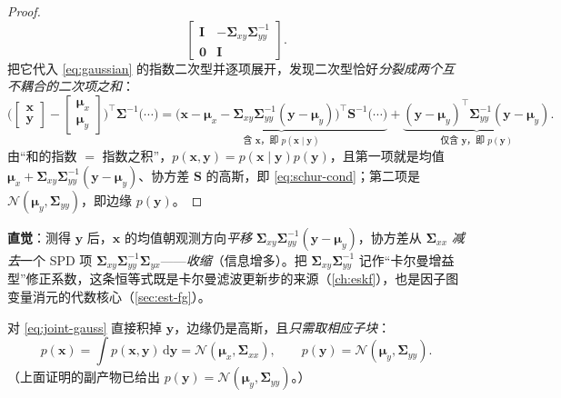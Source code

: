 \begin{proof}
\[   \begin{bmatrix}\mathbf{I}&-\boldsymbol{\Sigma}_{xy}\boldsymbol{\Sigma}_{yy}^{-1}\\\mathbf{0}&\mathbf{I}\end{bmatrix}.
\]
把它代入 \cref{eq:gaussian} 的指数二次型并逐项展开，发现二次型恰好\emph{分裂成两个互不耦合的二次项之和}：
\[
  \Big(\!\begin{bmatrix}\mathbf{x}\\\mathbf{y}\end{bmatrix}\!-\!\begin{bmatrix}\boldsymbol{\mu}_x\\\boldsymbol{\mu}_y\end{bmatrix}\!\Big)^{\!\top}\!\boldsymbol{\Sigma}^{-1}\!\Big(\cdots\Big)
  =\underbrace{\big(\mathbf{x}-\boldsymbol{\mu}_x-\boldsymbol{\Sigma}_{xy}\boldsymbol{\Sigma}_{yy}^{-1}(\mathbf{y}-\boldsymbol{\mu}_y)\big)^\top\mathbf{S}^{-1}\big(\cdots\big)}_{\text{含 }\mathbf{x}\text{，即 }p(\mathbf{x}\mid\mathbf{y})}
  +\underbrace{(\mathbf{y}-\boldsymbol{\mu}_y)^\top\boldsymbol{\Sigma}_{yy}^{-1}(\mathbf{y}-\boldsymbol{\mu}_y)}_{\text{仅含 }\mathbf{y}\text{，即 }p(\mathbf{y})}.
\]
由“和的指数 $=$ 指数之积”，$p(\mathbf{x},\mathbf{y})=p(\mathbf{x}\mid\mathbf{y})p(\mathbf{y})$，且第一项就是均值 $\boldsymbol{\mu}_x+\boldsymbol{\Sigma}_{xy}\boldsymbol{\Sigma}_{yy}^{-1}(\mathbf{y}-\boldsymbol{\mu}_y)$、协方差 $\mathbf{S}$ 的高斯，即 \cref{eq:schur-cond}；第二项是 $\mathcal{N}(\boldsymbol{\mu}_y,\boldsymbol{\Sigma}_{yy})$，即边缘 $p(\mathbf{y})$。
\end{proof}

\noindent\textbf{直觉}：测得 $\mathbf{y}$ 后，$\mathbf{x}$ 的均值朝观测方向\emph{平移} $\boldsymbol{\Sigma}_{xy}\boldsymbol{\Sigma}_{yy}^{-1}(\mathbf{y}-\boldsymbol{\mu}_y)$，协方差从 $\boldsymbol{\Sigma}_{xx}$ \emph{减去}一个 SPD 项 $\boldsymbol{\Sigma}_{xy}\boldsymbol{\Sigma}_{yy}^{-1}\boldsymbol{\Sigma}_{yx}$——\emph{收缩}（信息增多）。把 $\boldsymbol{\Sigma}_{xy}\boldsymbol{\Sigma}_{yy}^{-1}$ 记作“卡尔曼增益型”修正系数，这条恒等式既是卡尔曼滤波更新步的来源（\cref{ch:eskf}），也是因子图变量消元的代数核心（\cref{sec:est-fg}）。

\begin{corollary}\label{cor:cov-marginal}
对 \cref{eq:joint-gauss} 直接积掉 $\mathbf{y}$，边缘仍是高斯，且\emph{只需取相应子块}\cite{barfoot2024state}：
\begin{equation}
  p(\mathbf{x})=\int p(\mathbf{x},\mathbf{y})\,\mathrm{d}\mathbf{y}=\mathcal{N}(\boldsymbol{\mu}_x,\boldsymbol{\Sigma}_{xx}),\qquad
  p(\mathbf{y})=\mathcal{N}(\boldsymbol{\mu}_y,\boldsymbol{\Sigma}_{yy}).
  \label{eq:cov-marginal}
\end{equation}
（上面证明的副产物已给出 $p(\mathbf{y})=\mathcal{N}(\boldsymbol{\mu}_y,\boldsymbol{\Sigma}_{yy})$。）
\end{corollary}

